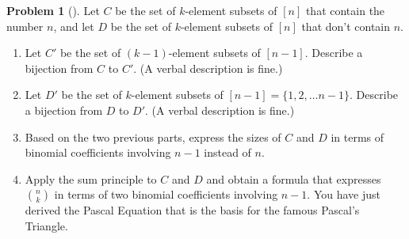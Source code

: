 \documentclass[10pt,]{book}
\theoremstyle{plain}
\theoremstyle{definition}
\newtheorem{activity}[project]{Problem}
\theoremstyle{definition}
\numberwithin{equation}{chapter}
\begin{document}
\begin{activity}[] \label{Pascal}
\hypertarget{p-154}{}%
Let \(C\) be the set of \(k\)-element subsets of \([n]\) that contain the number \(n\), and let \(D\) be the set of \(k\)-element subsets of \([n]\) that don't contain \(n\).%
\begin{enumerate}[font=\bfseries,label=(\alph*),ref=\alph*]
\item\label{task-21} \marginsymbol[-2.5em]{} \hypertarget{p-155}{}%
Let \(C'\) be the set of \((k-1)\)-element subsets of \([n-1]\).  Describe a bijection from \(C\) to \(C'\).  (A verbal description is fine.)%
\item\label{task-22} \marginsymbol[-2.5em]{} \hypertarget{p-157}{}%
Let \(D'\) be the set of \(k\)-element subsets of \([n-1]=\{1,2,\ldots n-1\}\).  Describe a bijection from \(D\) to \(D'\). (A verbal description is fine.)%
\item\label{task-23} \marginsymbol[-2.5em]{} \hypertarget{p-159}{}%
Based on the two previous parts, express the sizes of \(C\) and \(D\) in terms of binomial coefficients involving \(n-1\) instead of \(n\).%
\item\label{task-24} \marginsymbol[-2.5em]{} \hypertarget{p-161}{}%
Apply the sum principle to \(C\) and \(D\) and obtain a formula that expresses \(\binom{n}{k}\) in terms of two binomial coefficients involving \(n-1\).  You have just derived the Pascal Equation that is the basis for the famous Pascal's Triangle.%
\end{enumerate}
\end{activity}
\typeout{************************************************}
\typeout{************************************************}
\end{document}
